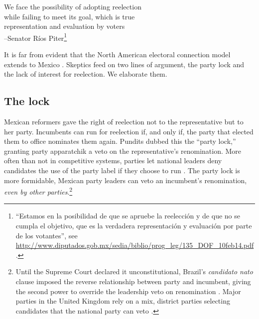 \documentclass[letter,12pt]{article}
\begin{document}
\begin{center}
\begin{singlespacing}
  We face the possibility of adopting reelection \\
  while failing to meet its goal, which is true \\
  representation and evaluation by voters \\
  --Senator Ríos Piter\footnote{``Estamos en la posibilidad de que se apruebe la reelección y de que no se cumpla el objetivo, que es la verdadera representación y evaluación por parte de los votantes'', see \url{http://www.diputados.gob.mx/sedia/biblio/prog_leg/135_DOF_10feb14.pdf}.}
\end{singlespacing}
\end{center}

\noindent It is far from evident that the North American electoral connection model extends to Mexico \citep[or to democracies in general, see][]{samuels.2003,jones.etal.amateurLegis.2002}. Skeptics feed on two lines of argument, the party lock and the lack of interest for reelection. We elaborate them. 

\subsection{The lock}

Mexican reformers gave the right of reelection not to the representative but to her party. Incumbents can run for reelection if, and only if, the party that elected them to office nominates them again. Pundits dubbed this the ``party lock,'' granting party apparatchik a veto on the representative's renomination. More often than not in competitive systems, parties let national leaders deny candidates the use of the party label if they choose to run \citep[:85]{ranney.cand-sel.1981}. The party lock is more formidable, Mexican party leaders can veto an incumbent's renomination, \emph{even by other parties}.\footnote{Until the Supreme Court declared it unconstitutional, Brazil's \emph{candidato nato} clause imposed the reverse relationship between party and incumbent, giving the second power to override the leadership veto on renomination \citep{mainwaring.1991}. Major parties in the United Kingdom rely on a mix, district parties selecting candidates that the national party can veto \citep{mikulska.uk.cand.sel2010}.}
\end{document}

